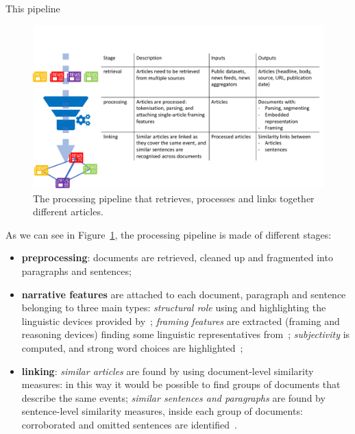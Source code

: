 This pipeline

\begin{figure}[!htb]
    \centering
    \includegraphics[width=\textwidth]{figures/figure_pipeline.pdf}
    \caption{The processing pipeline that retrieves, processes and links together different articles.}
    \label{fig:pipeline}
\end{figure}

As we can see in Figure~\ref{fig:pipeline}, the processing pipeline is made of different stages:
\begin{itemize}
    \item \textbf{preprocessing}: documents are retrieved, cleaned up and fragmented into paragraphs and sentences;
    \item \textbf{narrative features} are attached to each document, paragraph and sentence belonging to three main types:
    \emph{structural role} using and highlighting the linguistic devices provided by~\cite{zahid2019towards};
    \emph{framing features} are extracted (framing and reasoning devices) finding some linguistic representatives from~\cite{gamson1989media,fillmore2006frame};
    \emph{subjectivity} is computed, and strong word choices are highlighted~\cite{liu2010sentiment};
    \item \textbf{linking}: \emph{similar articles} are found by using document-level similarity measures: in this way it would be possible to find groups of documents that describe the same events; \emph{similar sentences and paragraphs} are found by sentence-level similarity measures, inside each group of documents: corroborated and omitted sentences are identified~\cite{bountouridis2018explaining}.
\end{itemize}

